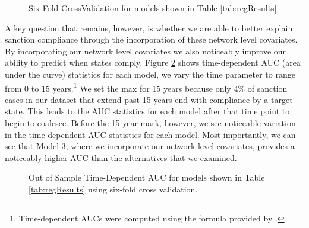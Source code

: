 \begin{figure}[ht]
	\centering
	\caption{Six-Fold CrossValidation for models shown in Table \ref{tab:regResults}.}
	\resizebox{1\textwidth}{!}{}
	\label{fig:crossval}
\end{figure}
\FloatBarrier

A key question that remains, however, is whether we are able to better explain sanction compliance through the incorporation of these network level covariates. By incorporating our network level covariates we also noticeably improve our ability to predict when states comply. Figure \ref{fig:auc} shows time-dependent AUC (area under the curve) statistics for each model, we vary the time parameter to range from 0 to 15 years.\footnote{Time-dependent AUCs were computed using the formula provided by \citet{chambless2006estimation}.} We set the max for 15 years because only 4\% of sanction cases in our dataset that extend past 15 years end with compliance by a target state. This leads to the AUC statistics for each model after that time point to begin to coalesce. Before the 15 year mark, however, we see noticeable variation in the time-dependent AUC statistics for each model. Most importantly, we can see that Model 3, where we incorporate our network level covariates, provides a noticeably higher AUC than the alternatives that we examined.

\begin{figure}[ht]
	\centering
	\caption{Out of Sample Time-Dependent AUC for models shown in Table \ref{tab:regResults} using six-fold cross validation.}
	\resizebox{0.8\textwidth}{!}{}
	\label{fig:auc}
\end{figure}
\FloatBarrier
